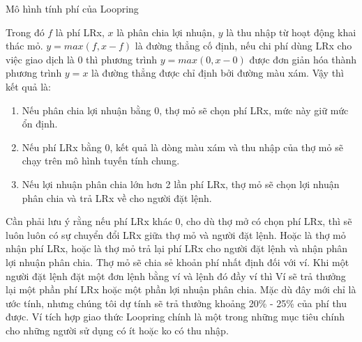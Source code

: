 \documentclass{article}
\makeatletter
\newenvironment{figurehere}
 {\def\@captype{figure}}
 {}
\makeatother
\begin{document}
\begin{multicols}{2}
\begin{center}
\begin{figurehere}
\caption{Mô hình tính phí của Loopring}
\label{fig:feemodel}
\end{figurehere}
\end{center}
Trong đó $f$  là phí LRx, $x$ là phân chia lợi nhuận, $y$ là thu nhập từ hoạt động khai thác mỏ. $y=max(f, x-f)$ là đường thẳng cố định, nếu chi phí dùng LRx cho việc giao dịch là $0$ thì phương trình $y=max(0, x - 0)$ được đơn giản hóa thành phương trình $y=x$ là đường thẳng được chỉ định bởi đường màu xám.
Vậy thì kết quả là:  
\begin{enumerate}
	\item Nếu phân chia lợi nhuận bằng 0, thợ mỏ sẽ chọn phí LRx, mức này giữ mức ổn định. 
	\item Nếu phí LRx bằng 0, kết quả là dòng màu xám và thu nhập của thợ mỏ sẽ chạy trên mô hình tuyến tính chung.
	\item Nếu lợi nhuận phân chia lớn hơn 2 lần phí LRx, thợ mỏ sẽ chọn lợi nhuận phân chia và trả LRx về cho người đặt lệnh.
\end{enumerate}
Cần phải lưu ý rằng nếu phí LRx khác 0, cho dù thợ mở có chọn phí LRx, thì sẽ luôn luôn có sự chuyển đổi LRx giữa thợ mỏ và người đặt lệnh. Hoặc là thợ mỏ nhận phí LRx, hoặc là thợ mỏ trả lại phí LRx cho người đặt lệnh và nhận phân lợi nhuận phân chia.
Thợ mỏ sẽ chia sẻ khoản phí nhất định đối với ví. Khi một người đặt lệnh đặt một đơn lệnh bằng ví và lệnh đó đầy ví thì Ví sẽ trả thưởng lại một phần phí LRx hoặc một phần lợi nhuận phân chia. Mặc dù đây mới chỉ là ước tính, nhưng chúng tôi dự tính sẽ trả thưởng khoảng 20\% - 25\% của phí thu được. Ví tích hợp giao thức Loopring chính là một trong những mục tiêu chính cho những người sử dụng có ít hoặc ko có thu nhập.

\end{multicols}
\end{document}
